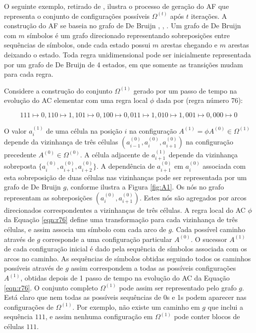 \documentclass[12pt,a4paper]{article}
\begin{document}
O seguinte exemplo, retirado de , ilustra o processo de
geração do AF que representa o conjunto de configurações
possíveis $\Omega^{(t)}$ após $t$ iterações. A construção do AF se baseia no
grafo de De Bruijn , ,
. Um grafo de De Bruijn com $m$ símbolos
é um grafo direcionado representando sobreposições entre sequências de símbolos,
onde cada estado possui $m$ arestas chegando e $m$ arestas deixando o estado.
Toda regra unidimensional pode ser inicialmente representada por um grafo de De
Bruijn de 4 estados, em que somente as transições mudam para cada regra.

Considere a construção do conjunto $\Omega^{(1)}$ gerado por um passo de
tempo na evolução do AC elementar com uma regra
local $\phi$ dada por (regra número 76):

\begin{equation}\label{eqn:r76}
111 \mapsto 0, 110 \mapsto 1, 101 \mapsto 0, 100 \mapsto 0, 011 \mapsto 1, 010 \mapsto 1,
001 \mapsto 0, 000 \mapsto 0
\end{equation}

O valor $a_i^{(1)}$ de uma célula na posição $i$ na configuração
$A^{(1)} = \phi A^{(0)} \in \Omega^{(1)}$ depende da vizinhança de três
células $(a_{i-1}^{(0)},a_i^{(0)},a_{i+1}^{(0)})$ na configuração precedente
$A^{(0)} \in \Omega^{(0)}$. A célula adjacente de $a_{i+1}^{(1)}$ depende da
vizinhança sobreposta $\{a_i^{(0)},a_{i+1}^{(0)},a_{i+2}^{(0)}\}$. A
dependência de $a_{i+1}^{(0)}$ em $a_i^{(0)}$ associada com esta sobreposição
de duas células nas vizinhanças pode ser representada por um grafo de
De Bruijn $g$, conforme
ilustra a Figura \ref{fig:A1}. Os nós no grafo representam as sobreposições
$(a_i^{(0)},a_{i+1}^{(0)})$. Estes nós são agregados por arcos direcionados
correspondentes a vizinhanças de três células. A regra local do AC
$\phi$ da Equação \ref{eqn:r76} define uma transformação para cada
vizinhança de três células, e assim associa um símbolo com cada arco de $g$.
Cada possível caminho através de $g$ corresponde a uma configuração particular
$A^{(0)}$. O sucessor $A^{(1)}$ de cada configuração inicial é dado pela
sequência de símbolos associada com os arcos no caminho. As sequências de
símbolos obtidas seguindo todos os caminhos possíveis através de $g$ assim
correspondem a todas as possíveis configurações $A^{(1)}$, obtidas depois
de 1 passo de tempo na evolução do AC da Equação \ref{eqn:r76}. O
conjunto completo $\Omega^{(1)}$ pode assim ser representado pelo grafo
$g$. Está claro que nem todas as possíveis sequências de 0s e 1s podem
aparecer nas configurações de $\Omega^{(1)}$. Por exemplo, não existe um
caminho em $g$ que inclui a sequência $111$, e assim nenhuma
configuração em $\Omega^{(1)}$ pode conter blocos de células $111$.
\end{document}
